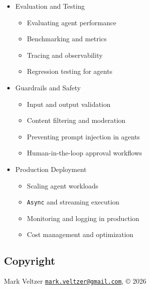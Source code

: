 \documentclass[
]{article}
\providecommand{\tightlist}{%
  \setlength{\itemsep}{0pt}\setlength{\parskip}{0pt}}
\begin{document}
\begin{itemize}
  \begin{itemize}
  \tightlist
  \item
    Agent communication protocols
  \item
    Task decomposition and delegation
  \item
    Supervisor and hierarchical patterns
  \item
    Collaborative problem-solving
  \end{itemize}
\item
  Evaluation and Testing

  \begin{itemize}
  \tightlist
  \item
    Evaluating agent performance
  \item
    Benchmarking and metrics
  \item
    Tracing and observability
  \item
    Regression testing for agents
  \end{itemize}
\item
  Guardrails and Safety

  \begin{itemize}
  \tightlist
  \item
    Input and output validation
  \item
    Content filtering and moderation
  \item
    Preventing prompt injection in agents
  \item
    Human-in-the-loop approval workflows
  \end{itemize}
\item
  Production Deployment

  \begin{itemize}
  \tightlist
  \item
    Scaling agent workloads
  \item
    \texttt{Async} and streaming execution
  \item
    Monitoring and logging in production
  \item
    Cost management and optimization
  \end{itemize}
\end{itemize}

\subsection{Copyright}\label{copyright}

Mark Veltzer
\href{mailto:mark.veltzer@gmail.com}{\nolinkurl{mark.veltzer@gmail.com}},
© 2026
\end{document}
